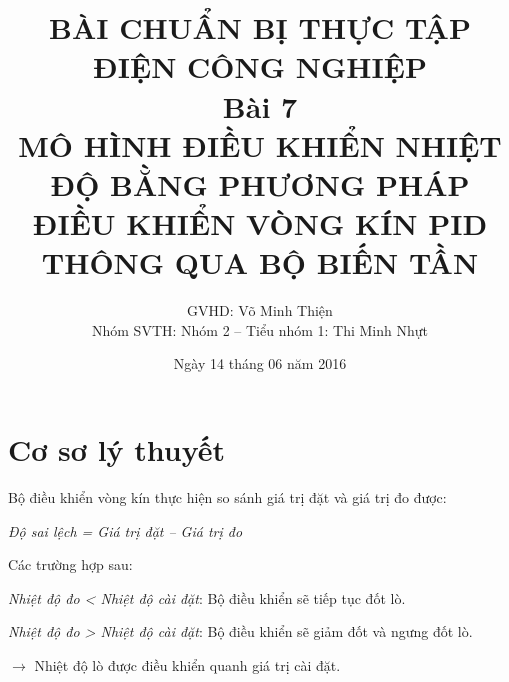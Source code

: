 \documentclass[13pt,a4paper]{extarticle}
\begin{document}
\title{\Large{\textbf{BÀI CHUẨN BỊ THỰC TẬP ĐIỆN CÔNG NGHIỆP}}\\\vspace{1cm}\textbf{Bài 7}\\\vspace{.5cm}\textbf{MÔ HÌNH ĐIỀU KHIỂN NHIỆT ĐỘ BẰNG PHƯƠNG PHÁP ĐIỀU KHIỂN VÒNG KÍN PID THÔNG QUA BỘ BIẾN TẦN}}
\date{Ngày 14 tháng 06 năm 2016}
\author{GVHD: Võ Minh Thiện \vspace{.6cm}\\  Nhóm SVTH: Nhóm 2 -- Tiểu nhóm 1: Thi Minh Nhựt}
\maketitle
\tableofcontents
\newpage
{}
\setcounter{page}{1}
\section{Cơ sơ lý thuyết}
Bộ điều khiển vòng kín thực hiện so sánh giá trị đặt và giá trị đo được:
\begin{center}
\textit{Độ sai lệch = Giá trị đặt -- Giá trị đo}
\end{center}

Các trường hợp sau:
\begin{list}{+}{}
\item \textit{Nhiệt độ đo < Nhiệt độ cài đặt}: Bộ điều khiển sẽ tiếp tục đốt lò.
\item \textit{Nhiệt độ đo > Nhiệt độ cài đặt}: Bộ điều khiển sẽ giảm đốt và ngưng đốt lò.
\item[$\rightarrow$] Nhiệt độ lò được điều khiển quanh giá trị cài đặt.
\end{list}
\end{document}
